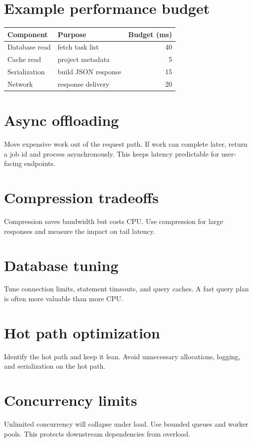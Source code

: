 \section{Example performance budget}
\begin{tabularx}{\textwidth}{@{}lXr@{}}
\toprule
Component & Purpose & Budget (ms) \\
\midrule
Database read & fetch task list & 40 \\
Cache read & project metadata & 5 \\
Serialization & build JSON response & 15 \\
Network & response delivery & 20 \\
\bottomrule
\end{tabularx}

\section{Async offloading}
Move expensive work out of the request path.
If work can complete later, return a job id and process asynchronously.
This keeps latency predictable for user-facing endpoints.

\section{Compression tradeoffs}
Compression saves bandwidth but costs CPU.
Use compression for large responses and measure the impact on tail latency.

\section{Database tuning}
Tune connection limits, statement timeouts, and query caches.
A fast query plan is often more valuable than more CPU.

\section{Hot path optimization}
Identify the hot path and keep it lean.
Avoid unnecessary allocations, logging, and serialization on the hot path.

\section{Concurrency limits}
Unlimited concurrency will collapse under load.
Use bounded queues and worker pools.
This protects downstream dependencies from overload.

